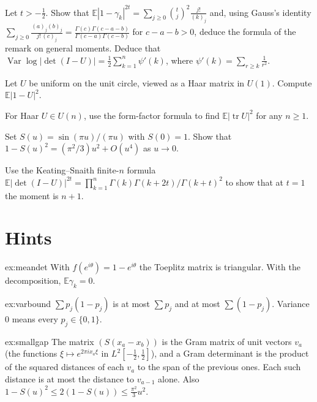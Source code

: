 \begin{exercise}[$\star\star\star$]\label{ex:kstreal}
Let $t>-\frac12$. Show that $\mathbb E|1-\gamma_k|^{2t}=\sum_{j\ge0}\binom tj^2\frac{j!}{(k)_j}$ and, using Gauss's identity $\sum_{j\ge0}\frac{(a)_j(b)_j}{j!\,(c)_j}=\frac{\Gamma(c)\Gamma(c-a-b)}{\Gamma(c-a)\Gamma(c-b)}$ for $c-a-b>0$, deduce the
formula of the remark on general moments. Deduce that $\operatorname{Var}\log|\det(I-U)|=\frac12\sum_{k=1}^n\psi'(k)$, where $\psi'(k)=\sum_{r\ge k}\frac1{r^2}$.
\end{exercise}

\begin{exercise}[$\star$]\label{ex:v12unitcircle}
Let $U$ be uniform on the unit circle, viewed as a Haar matrix in $U(1)$. Compute $\mathbb E|1-U|^2$.
\end{exercise}

\begin{exercise}[$\star$]\label{ex:v12traceone}
For Haar $U\in U(n)$, use the form-factor formula to find $\mathbb E|\operatorname{tr}U|^2$ for any $n\ge1$.
\end{exercise}

\begin{exercise}[$\star\star$]\label{ex:v12sinequadratic}
Set $S(u)=\sin(\pi u)/(\pi u)$ with $S(0)=1$. Show that $1-S(u)^2=(\pi^2/3)u^2+O(u^4)$ as $u\to0$.
\end{exercise}

\begin{exercise}[$\star\star\star$]\label{ex:v12kssecond}
Use the Keating--Snaith finite-$n$ formula $\mathbb E|\det(I-U)|^{2t}=\prod_{k=1}^n\Gamma(k)\Gamma(k+2t)/\Gamma(k+t)^2$ to show that at $t=1$ the moment is $n+1$.
\end{exercise}

\section{Hints}

\begin{hint}{ex:meandet}
With $f(e^{i\theta})=1-e^{i\theta}$ the Toeplitz matrix is triangular. With the decomposition, $\mathbb E\gamma_k=0$.
\end{hint}

\begin{hint}{ex:varbound}
$\sum p_j(1-p_j)$ is at most $\sum p_j$ and at most $\sum(1-p_j)$. Variance $0$ means every $p_j\in\{0,1\}$.
\end{hint}

\begin{hint}{ex:smallgap}
The matrix $(S(x_a-x_b))$ is the Gram matrix of unit vectors $v_a$ (the functions $\xi\mapsto e^{2\pi ix_a\xi}$ in $L^2[-\frac12,\frac12]$), and a Gram determinant is the product of the squared distances of each $v_a$ to the span of the previous ones. Each such distance is at most the distance to $v_{a-1}$ alone. Also $1-S(u)^2\le2(1-S(u))\le\frac{\pi^2}3u^2$.
\end{hint}


